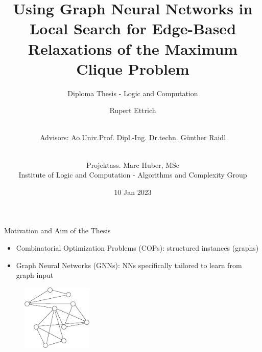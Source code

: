 \documentclass{beamer}
\title{Using Graph Neural Networks in Local Search for Edge-Based Relaxations of the Maximum Clique Problem}
\subtitle{Diploma Thesis - Logic and Computation}
\author{Rupert Ettrich \and \\ \scriptsize Advisors:  Ao.Univ.Prof. Dipl.-Ing. Dr.techn. Günther Raidl \and \\ Projektass. Marc Huber, MSc \\ Institute of Logic and Computation - Algorithms and Complexity Group}
\date{10 Jan 2023}
\begin{document}
\maketitle

    

\begin{frame}{Motivation and Aim of the Thesis}
    \begin{itemize}
        \item<1-> Combinatorial Optimization Problems (COPs): structured instances (graphs)
        \item<2-> Graph Neural Networks (GNNs): NNs specifically tailored to learn from graph input 
    \end{itemize}
\begin{figure}
    \centering
    \includegraphics[width=0.3\textwidth]{graphics/graph1.eps}
\end{figure}
\end{frame}
\end{document}
